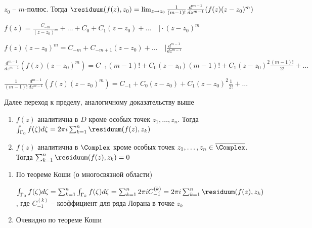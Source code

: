 \documentclass[12pt]{article}
\begin{document}
\begin{MyTheorem}
    \Ths $z_0$ -- $m$-полюс. Тогда $\residuum(f(z), z_0) = \lim_{z \to z_0} \frac{1}{(m - 1)!} \frac{d^{m - 1}}{dz^{m - 1}} (f(z) (z - z_0)^m)$
\end{MyTheorem}

\begin{MyProof}
    $f(z) = \frac{C_{-m}}{(z - z_0)^m} + \dots + C_0 + C_1 (z - z_0) + \dots \quad \Big| \cdot (z - z_0)^m$

    $f(z) (z - z_0)^m = C_{-m} + C_{-m+1} (z - z_0) + \dots  \quad \Big| \frac{d^{m - 1}}{dz^{m - 1}}$

    $\frac{d^{m - 1}}{dz^{m - 1}} (f(z) (z - z_0)^m) = C_{-1} (m - 1)! + C_0 (z - z_0) (m - 1)! + C_1 (z - z_0)^2 \frac{(m - 1)!}{2!} + \dots$

    $\frac{1}{(m - 1)!} \frac{d^{m - 1}}{dz^{m - 1}} (f(z) (z - z_0)^m) = C_{-1} + C_0 (z - z_0) + C_1 (z - z_0)^2 \frac{1}{2!} + \dots$

    Далее переход к пределу, аналогичному доказательству выше
\end{MyProof}

\begin{MyTheorem}

    \begin{enumerate}
        \item $f(z)$ аналитична в $D$ кроме особых точек $z_1, \dots, z_n$. Тогда $\int_{\Gamma_0} f(\zeta) d\zeta = 2\pi i \sum_{k = 1}^n \residuum(f(z), z_k)$

        \item $f(z)$ аналитична в $\Complex$ кроме особых точек $z_1, \dots, z_n \in \overline{\Complex}$. Тогда $\sum_{k = 1}^n \residuum(f(z), z_k) = 0$
    \end{enumerate}
\end{MyTheorem}

\begin{MyProof}
    \begin{enumerate}
        \item По теореме Коши (о многосвязной области)

        $\int_{\Gamma_0} f(\zeta) d\zeta = \sum_{k = 1}^n \int_{\Gamma_k} f(\zeta) d\zeta = \sum_{k = 1}^n 2 \pi i C^{(k)}_{-1} = 2 \pi i \sum_{k = 1}^n \residuum(f(z), z_k)$, где $C^{(k)}_{-1}$ -- коэффициент для ряда Лорана в точке $z_k$

        \item Очевидно по теореме Коши
    \end{enumerate}
\end{MyProof}
\end{document}
